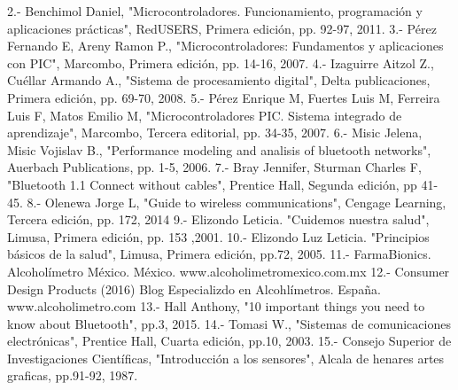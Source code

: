 2.- Benchimol Daniel, "Microcontroladores. Funcionamiento, programación y aplicaciones prácticas", RedUSERS, Primera edición, pp. 92-97, 2011.
3.- Pérez Fernando E, Areny Ramon P., "Microcontroladores: Fundamentos y aplicaciones con PIC", Marcombo, Primera edición, pp. 14-16, 2007.
4.- Izaguirre Aitzol Z., Cuéllar Armando A., "Sistema de procesamiento digital", Delta publicaciones, Primera edición, pp. 69-70, 2008.
5.- Pérez Enrique M, Fuertes Luis M, Ferreira Luis F, Matos Emilio M, "Microcontroladores PIC. Sistema integrado de aprendizaje", Marcombo, Tercera editorial, pp. 34-35, 2007.
6.- Misic Jelena, Misic Vojislav B., "Performance modeling and analisis of bluetooth networks", Auerbach Publications, pp. 1-5, 2006.
7.- Bray Jennifer, Sturman Charles F, "Bluetooth 1.1 Connect without cables", Prentice Hall, Segunda edición, pp 41-45.
8.- Olenewa Jorge L, "Guide to wireless communications", Cengage Learning, Tercera edición, pp. 172, 2014
9.- Elizondo Leticia. "Cuidemos nuestra salud", Limusa, Primera edición, pp. 153 ,2001.
10.- Elizondo Luz Leticia. "Principios básicos de la salud", Limusa, Primera edición, pp.72, 2005.
11.- FarmaBionics. Alcoholímetro México. México.  www.alcoholimetromexico.com.mx
12.- Consumer Design Products (2016) Blog Especializdo en Alcohlímetros. España. www.alcoholimetro.com
13.- Hall Anthony, "10 important things you need to know about Bluetooth", pp.3, 2015.
14.- Tomasi W., "Sistemas de comunicaciones electrónicas", Prentice Hall, Cuarta edición, pp.10, 2003.
15.- Consejo Superior de Investigaciones Científicas, "Introducción a los sensores", Alcala de henares artes graficas, pp.91-92, 1987.
